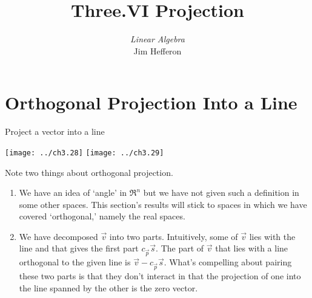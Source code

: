 \documentclass[10pt,t,serif,professionalfont]{beamer}
\title[Projection] %
{Three.VI Projection}
\author{\textit{Linear Algebra} \\ {\small Jim Hef{}feron}}
\institute{
  \texttt{http://joshua.smcvt.edu/linearalgebra}
}
\date{}
\begin{document}
\begin{frame}
  \titlepage
\end{frame}




\section{Orthogonal Projection Into a Line}
\begin{frame}{Project a vector into a line}
\begin{center}
  \texttt{[image: ../ch3.28]}
  \hspace*{0.6in}
  \texttt{[image: ../ch3.29]}      
\end{center}
\pause
{}

\pause
{}
\end{frame}




\begin{frame}
Note two things about orthogonal projection.
\begin{enumerate}
\item 
We have an idea of `angle' in $\Re^n$ but we have not given such a 
definition in some other spaces.
This section's results will stick to spaces in which we have 
covered `orthogonal,' namely the real spaces.

\pause
\item 
We have decomposed $\vec{v}$ into two parts.
Intuitively, some of $\vec{v}$ lies with the line and that gives
the first part $c_{\vec{p}}\vec{s}$.
The part of $\vec{v}$ that lies with a line orthogonal to 
the given line is $\vec{v}-c_{\vec{p}}\vec{s}$.
What's compelling about pairing these two parts 
is that they don't interact in that the projection of one into the line
spanned by the other is the zero vector.
\end{enumerate}
\end{frame}
\end{document}
